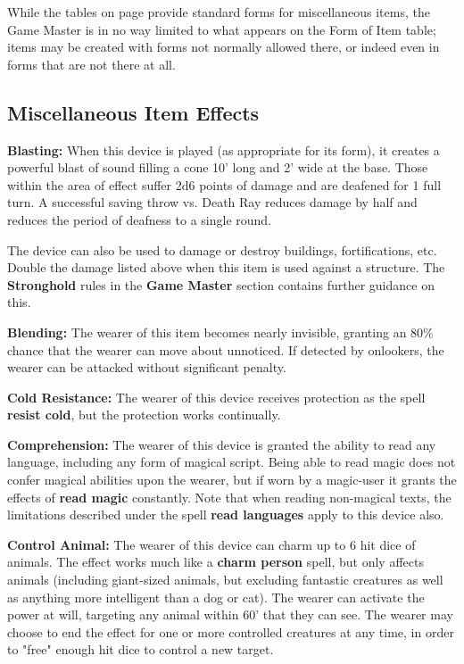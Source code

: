 \documentclass[a4paper,twoside,openany,10pt]{book}
\begin{document}
\begin{multicols}{2}
While the tables on page \hyperlink{miscellaneous-items}{\pageref{miscellaneous-items}} provide standard forms for miscellaneous items, the Game Master is in no way limited to what appears on the Form of Item table; items may be created with forms not normally allowed there, or indeed even in forms that are not there at all.

\subsection{Miscellaneous Item Effects}\label{miscellaneous-item-effects}

\textbf{Blasting:} When this device is played (as appropriate for its form), it creates a powerful blast of sound filling a cone 10' long and 2' wide at the base. Those within the area of effect suffer 2d6 points of damage and are deafened for 1 full turn. A successful saving throw vs. Death Ray reduces damage by half and reduces the period of deafness to a single round.

The device can also be used to damage or destroy buildings, fortifications, etc. Double the damage listed above when this item is used against a structure. The \textbf{Stronghold} rules in the \textbf{Game Master} section contains further guidance on this.

\textbf{Blending: } The wearer of this item becomes nearly invisible, granting an 80\% chance that the wearer can move about unnoticed. If detected by onlookers, the wearer can be attacked without significant penalty.

\textbf{Cold Resistance:} The wearer of this device receives protection as the spell \textbf{resist cold}, but the protection works continually.

\textbf{Comprehension:} The wearer of this device is granted the ability to read any language, including any form of magical script. Being able to read magic does not confer magical abilities upon the wearer, but if worn by a magic-user it grants the effects of \textbf{read magic} constantly. Note that when reading non-magical texts, the limitations described under the spell \textbf{read languages} apply to this device also.

\textbf{Control Animal:} The wearer of this device can charm up to 6 hit dice of animals. The effect works much like a \textbf{charm person} spell, but only affects animals (including giant-sized animals, but excluding fantastic creatures as well as anything more intelligent than a dog or cat). The wearer can activate the power at will, targeting any animal within 60' that they can see. The wearer may choose to end the effect for one or more controlled creatures at any time, in order to "free" enough hit dice to control a new target.


\end{multicols}
\end{document}
